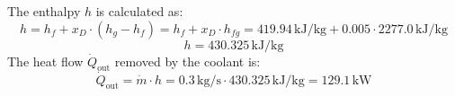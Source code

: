 The enthalpy \( h \) is calculated as:  
\[
h = h_f + x_D \cdot (h_g - h_f) = h_f + x_D \cdot h_{fg} = 419.94 \, \text{kJ/kg} + 0.005 \cdot 2277.0 \, \text{kJ/kg}
\]  
\[
h = 430.325 \, \text{kJ/kg}
\]  
The heat flow \( \dot{Q}_{\text{out}} \) removed by the coolant is:  
\[
\dot{Q}_{\text{out}} = \dot{m} \cdot h = 0.3 \, \text{kg/s} \cdot 430.325 \, \text{kJ/kg} = 129.1 \, \text{kW}
\]